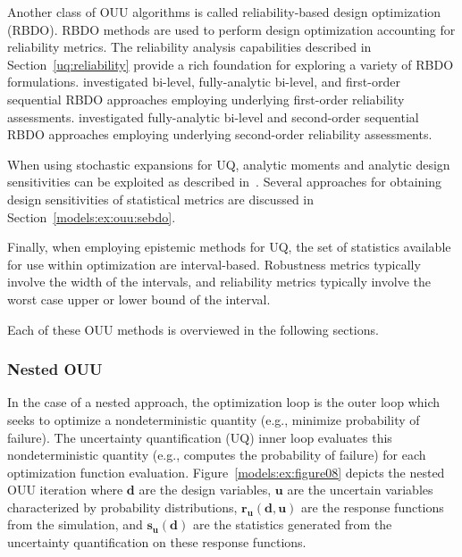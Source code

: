 Another class of OUU algorithms is called reliability-based design
optimization (RBDO).  RBDO methods are used to perform design
optimization accounting for reliability metrics.  The reliability
analysis capabilities described in Section~\ref{uq:reliability}
provide a rich foundation for exploring a variety of RBDO
formulations.  \cite{Eld05} investigated bi-level, fully-analytic
bi-level, and first-order sequential RBDO approaches employing
underlying first-order reliability assessments.
\cite{Eld06a} investigated fully-analytic bi-level and 
second-order sequential RBDO approaches employing underlying
second-order reliability assessments.  

When using stochastic expansions for UQ, analytic moments and
analytic design sensitivities can be exploited as described
in~\cite{Eld07}.  Several approaches for obtaining design
sensitivities of statistical metrics are discussed in 
Section~\ref{models:ex:ouu:sebdo}.

Finally, when employing epistemic methods for UQ, the set of
statistics available for use within optimization are interval-based.
Robustness metrics typically involve the width of the intervals, and
reliability metrics typically involve the worst case upper or lower
bound of the interval.

Each of these OUU methods is overviewed in the following sections.

\subsubsection{Nested OUU}\label{models:ex:ouu:nested}

In the case of a nested approach, the optimization loop is the outer
loop which seeks to optimize a nondeterministic quantity (e.g.,
minimize probability of failure). The uncertainty quantification (UQ)
inner loop evaluates this nondeterministic quantity (e.g., computes
the probability of failure) for each optimization function evaluation.
Figure~\ref{models:ex:figure08} depicts the nested OUU iteration where
$\mathit{\mathbf{d}}$ are the design variables, $\mathit{\mathbf{u}}$
are the uncertain variables characterized by probability
distributions, $\mathit{\mathbf{r_{u}(d,u)}}$ are the response
functions from the simulation, and $\mathit{\mathbf{s_{u}(d)}}$ are
the statistics generated from the uncertainty quantification on these
response functions.


